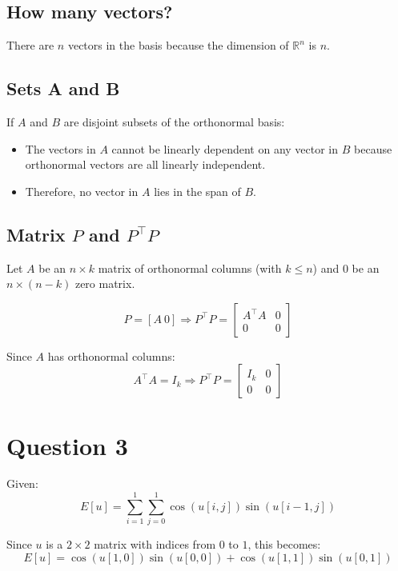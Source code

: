 \documentclass[12pt]{article}
\begin{document}
\subsection*{How many vectors?}

There are $n$ vectors in the basis because the dimension of $\mathbb{R}^n$ is $n$.

\subsection*{Sets A and B}

If $A$ and $B$ are disjoint subsets of the orthonormal basis:
\begin{itemize}
    \item The vectors in $A$ cannot be linearly dependent on any vector in $B$ because orthonormal vectors are all linearly independent.
    \item Therefore, no vector in $A$ lies in the span of $B$.
\end{itemize}

\subsection*{Matrix $P$ and $P^\top P$}

Let $A$ be an $n \times k$ matrix of orthonormal columns (with $k \leq n$) and $0$ be an $n \times (n - k)$ zero matrix.

\[
P = [A\ 0]
\Rightarrow P^\top P =
\begin{bmatrix}
A^\top A & 0 \\
0 & 0
\end{bmatrix}
\]

Since $A$ has orthonormal columns:
\[
A^\top A = I_k \Rightarrow P^\top P = 
\begin{bmatrix}
I_k & 0 \\
0 & 0
\end{bmatrix}
\]

\newpage

\section*{Question 3}

Given:
\[
E[u] = \sum_{i=1}^{1} \sum_{j=0}^{1} \cos(u[i, j]) \sin(u[i-1, j])
\]

Since $u$ is a $2 \times 2$ matrix with indices from $0$ to $1$, this becomes:
\[
E[u] = \cos(u[1,0]) \sin(u[0,0]) + \cos(u[1,1]) \sin(u[0,1])
\]
\end{document}
